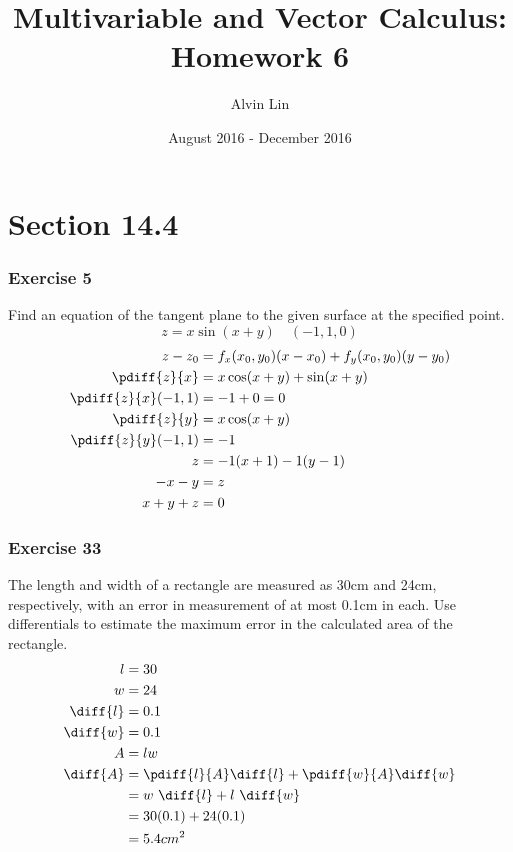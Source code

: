 \documentclass{math}
\title{Multivariable and Vector Calculus: Homework 6}
\author{Alvin Lin}
\date{August 2016 - December 2016}
\begin{document}
\maketitle

\section*{Section 14.4}

\subsubsection*{Exercise 5}
Find an equation of the tangent plane to the given surface at the specified
point.
\[ z = x\sin(x+y) \quad (-1,1,0) \]
\begin{align*}
  z-z_0 &= f_x(x_0,y_0)(x-x_0)+f_y(x_0,y_0)(y-y_0) \\
  \pdiff{z}{x} &= x\cos(x+y)+\sin(x+y) \\
  \pdiff{z}{x}(-1,1) &= -1+0 = 0 \\
  \pdiff{z}{y} &= x\cos(x+y) \\
  \pdiff{z}{y}(-1,1) &= -1 \\
  z &= -1(x+1)-1(y-1) \\
  -x-y &= z \\
  x+y+z &= 0
\end{align*}

\subsubsection*{Exercise 33}
The length and width of a rectangle are measured as 30cm and 24cm, respectively,
with an error in measurement of at most 0.1cm in each. Use differentials to
estimate the maximum error in the calculated area of the rectangle.
\begin{align*}
  l &= 30 \\
  w &= 24 \\
  \diff{l} &= 0.1 \\
  \diff{w} &= 0.1 \\
  A &= lw \\
  \diff{A} &= \pdiff{l}{A}\diff{l}+\pdiff{w}{A}\diff{w} \\
  &= w~\diff{l}+l~\diff{w} \\
  &= 30(0.1)+24(0.1) \\
  &= 5.4cm^2
\end{align*}
\end{document}
